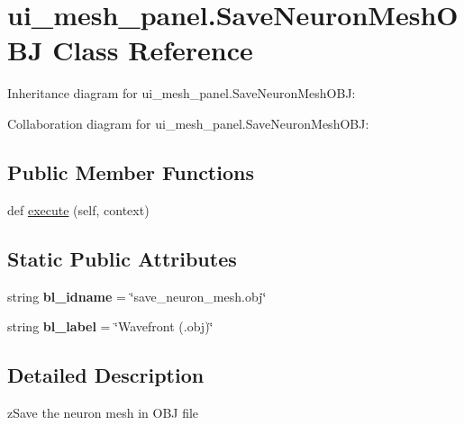 \hypertarget{classui__mesh__panel_1_1SaveNeuronMeshOBJ}{}\section{ui\+\_\+mesh\+\_\+panel.\+Save\+Neuron\+Mesh\+O\+BJ Class Reference}
\label{classui__mesh__panel_1_1SaveNeuronMeshOBJ}


Inheritance diagram for ui\+\_\+mesh\+\_\+panel.\+Save\+Neuron\+Mesh\+O\+BJ\+:


Collaboration diagram for ui\+\_\+mesh\+\_\+panel.\+Save\+Neuron\+Mesh\+O\+BJ\+:
\subsection*{Public Member Functions}
\begin{DoxyCompactItemize}
\item 
def \hyperlink{classui__mesh__panel_1_1SaveNeuronMeshOBJ_a9b1ba90f81a1d2a8968cccde3120df7c}{execute} (self, context)
\end{DoxyCompactItemize}
\subsection*{Static Public Attributes}
\begin{DoxyCompactItemize}
\item 
string {\bfseries bl\+\_\+idname} = \char`\"{}save\+\_\+neuron\+\_\+mesh.\+obj\char`\"{}\hypertarget{classui__mesh__panel_1_1SaveNeuronMeshOBJ_ac2a1761650c5005e09cf71972d9a866d}{}\label{classui__mesh__panel_1_1SaveNeuronMeshOBJ_ac2a1761650c5005e09cf71972d9a866d}

\item 
string {\bfseries bl\+\_\+label} = \char`\"{}Wavefront (.obj)\char`\"{}\hypertarget{classui__mesh__panel_1_1SaveNeuronMeshOBJ_a2259bdc26365188394cd9fbdd2669e9a}{}\label{classui__mesh__panel_1_1SaveNeuronMeshOBJ_a2259bdc26365188394cd9fbdd2669e9a}

\end{DoxyCompactItemize}


\subsection{Detailed Description}
\begin{DoxyVerb}zSave the neuron mesh in OBJ file\end{DoxyVerb}
 

